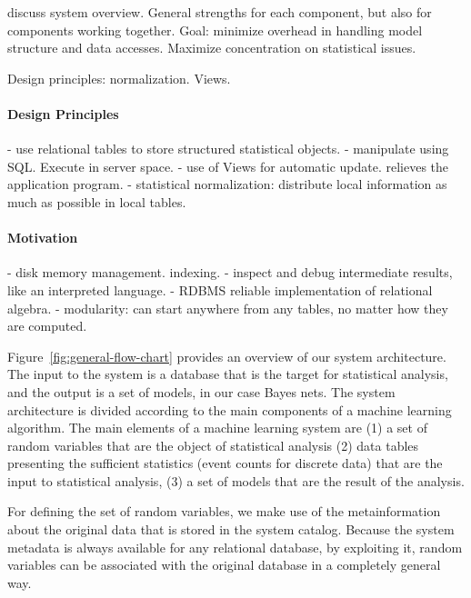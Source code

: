 \documentclass{acm_proc_article-sp}
\begin{document}
discuss system overview. General strengths for each component, but also for components working together. Goal: minimize overhead in handling model structure and data accesses. Maximize concentration on statistical issues.

Design principles: normalization. Views. 

\paragraph{Design Principles}

- use relational tables to store structured statistical objects.
- manipulate using SQL. Execute in server space.
- use of Views for automatic update. relieves the application program. 
- statistical normalization: distribute local information as much as possible in local tables.

\paragraph{Motivation}

- disk memory management. indexing.
- inspect and debug intermediate results, like an interpreted language.
- RDBMS reliable implementation of relational algebra. 
- modularity: can start anywhere from any tables, no matter how they are computed.

Figure~\ref{fig:general-flow-chart} provides an overview of our system architecture. The input to the system is a database that is the target for statistical analysis, and the output is a set of models, in our case Bayes nets. The system architecture is divided according to the main components of a machine learning algorithm. The main elements of a machine learning system are (1) a set of random variables that are the object of statistical analysis (2) data tables presenting the sufficient statistics (event counts for discrete data) that are the input to statistical analysis, (3) a set of models that are the result of the analysis. 

For defining the set of random variables, we make use of the metainformation about the original data that is stored in the system catalog.
 Because the system metadata is always available for any relational database,  by exploiting it, random variables can be associated with the original database in a completely general way. 
\end{document}
